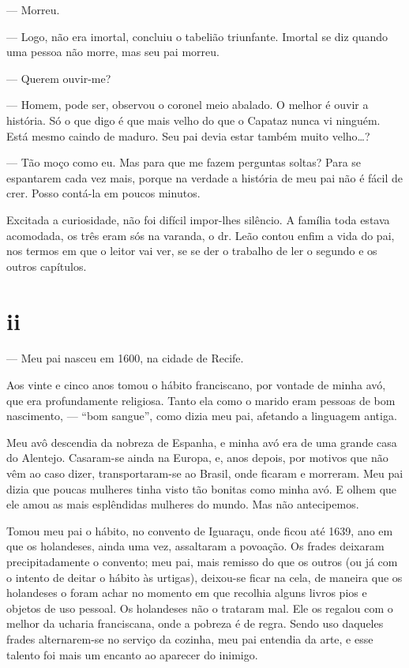 --- Morreu.

--- Logo, não era imortal, concluiu o tabelião triunfante. Imortal se
diz quando uma pessoa não morre, mas seu pai morreu.

--- Querem ouvir-me?

--- Homem, pode ser, observou o coronel meio abalado. O melhor é ouvir
a história. Só o que digo é que mais velho do que o Capataz nunca vi
ninguém. Está mesmo caindo de maduro. Seu pai devia estar também muito
velho\ldots{}?

--- Tão moço como eu. Mas para que me fazem perguntas soltas? Para se
espantarem cada vez mais, porque na verdade a história de meu pai não é
fácil de crer. Posso contá-la em poucos minutos.

Excitada a curiosidade, não foi difícil impor-lhes silêncio. A família
toda estava acomodada, os três eram sós na varanda, o dr. Leão contou
enfim a vida do pai, nos termos em que o leitor vai ver, se se der o
trabalho de ler o segundo e os outros capítulos.



\section*{ii}



--- Meu pai nasceu em 1600, na cidade de Recife.

Aos vinte e cinco anos tomou o hábito franciscano, por vontade de minha
avó, que era profundamente religiosa. Tanto ela como o marido eram
pessoas de bom nascimento, --- ``bom sangue'', como dizia meu pai,
afetando a linguagem antiga.

Meu avô descendia da nobreza de Espanha, e minha avó era de uma grande
casa do Alentejo. Casaram-se ainda na Europa, e, anos depois, por
motivos que não vêm ao caso dizer, transportaram-se ao Brasil, onde
ficaram e morreram. Meu pai dizia que poucas mulheres tinha visto tão
bonitas como minha avó. E olhem que ele amou as mais esplêndidas
mulheres do mundo. Mas não antecipemos.

Tomou meu pai o hábito, no convento de Iguaraçu, onde ficou até 1639,
ano em que os holandeses, ainda uma vez, assaltaram a povoação. Os
frades deixaram precipitadamente o convento; meu pai, mais remisso do
que os outros (ou já com o intento de deitar o hábito às urtigas),
deixou-se ficar na cela, de maneira que os holandeses o foram achar no
momento em que recolhia alguns livros pios e objetos de uso pessoal. Os
holandeses não o trataram mal. Ele os regalou com o melhor da ucharia
franciscana, onde a pobreza é de regra. Sendo uso daqueles frades
alternarem-se no serviço da cozinha, meu pai entendia da arte, e esse
talento foi mais um encanto ao aparecer do inimigo.

